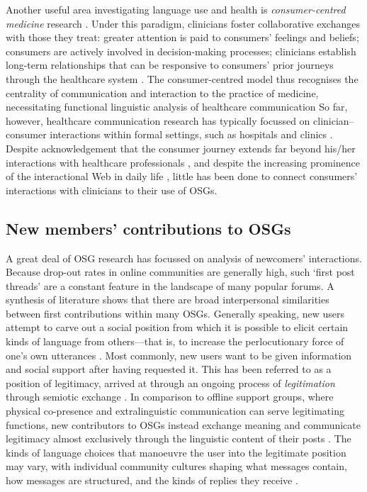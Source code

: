 \documentclass{article}
\renewcommand{\cite}{\parencite}
\begin{document}
	Another useful area investigating language use and health is \emph{consumer-centred medicine} research \cite{stewart_effective_1995}. Under this paradigm, clinicians foster collaborative exchanges with those they treat: greater attention is paid to consumers' feelings and beliefs; consumers are actively involved in decision-making processes; clinicians establish long-term relationships that can be responsive to consumers' prior journeys through the healthcare system \cite{woodward-kron_international_2016}. The consumer-centred model thus recognises the centrality of communication and interaction to the practice of medicine, necessitating functional linguistic analysis of healthcare communication%
	So far, however, healthcare communication research has typically focussed on clinician--consumer interactions within formal settings, such as hospitals and clinics \cite{slade_communicating_2015}. Despite acknowledgement that the consumer journey extends far beyond his\slash her interactions with healthcare professionals \cite{balka_situating_2010,dickerson_cancer_2011}, and despite the increasing prominence of the interactional Web in daily life \cite{hadlington_cognitive_2015}, little has been done to connect consumers' interactions with clinicians to their use of OSGs.

\subsection{New members' contributions to OSGs}

A great deal of OSG research has focussed on analysis of newcomers' interactions. Because drop-out rates in online communities are generally high, such `first post threads' are a constant feature in the landscape of many popular forums. A synthesis of literature shows that there are broad interpersonal similarities between first contributions within many OSGs. Generally speaking, new users attempt to carve out a social position from which it is possible to elicit certain kinds of language from others---that is, to increase the perlocutionary force of one's own utterances \cite{austin_how_1975,roberts_communicative_1996}. Most commonly, new users want to be given information and social support after having requested it. This has been referred to as a position of legitimacy, arrived at through an ongoing process of \emph{legitimation} through semiotic exchange \cite{davies_communities_2005,smithson_developing_2012,van_leeuwen_legitimation_2007}. In comparison to offline support groups, where physical co-presence and extralinguistic communication can serve legitimating functions, new contributors to OSGs instead exchange meaning and communicate legitimacy almost exclusively through the linguistic content of their posts \cite{galegher_legitimacy_1998}. The kinds of language choices that manoeuvre the user into the legitimate position may vary, with individual community cultures shaping what messages contain, how messages are structured, and the kinds of replies they receive \cite{gallagher_what_2015}.
\end{document}
